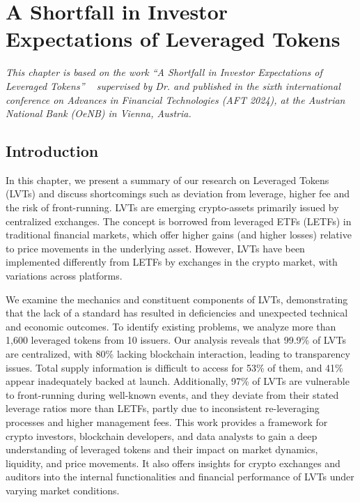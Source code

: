 
\chapter{A Shortfall in Investor Expectations of Leveraged Tokens}\label{ch:shortfall}

\textit{This chapter is based on the work ``A Shortfall in Investor Expectations of Leveraged Tokens'' ~\cite{shortfall} supervised by Dr. \supv and published in the sixth international conference on Advances in Financial Technologies (AFT 2024), at the Austrian National Bank (OeNB) in Vienna, Austria.}

\section{Introduction}
In this chapter, we present a summary of our research on Leveraged Tokens (LVTs) and discuss shortcomings such as deviation from leverage, higher fee and the risk of front-running. LVTs are emerging crypto-assets primarily issued by centralized exchanges. The concept is borrowed from leveraged ETFs (LETFs) in traditional financial markets, which offer higher gains (and higher losses) relative to price movements in the underlying asset. However, LVTs have been implemented differently from LETFs by exchanges in the crypto market, with variations across platforms.

We examine the mechanics and constituent components of LVTs, demonstrating that the lack of a standard has resulted in deficiencies and unexpected technical and economic outcomes. To identify existing problems, we analyze more than 1,600 leveraged tokens from 10 issuers. Our analysis reveals that 99.9\% of LVTs are centralized, with 80\% lacking blockchain interaction, leading to transparency issues. Total supply information is difficult to access for 53\% of them, and 41\% appear inadequately backed at launch. Additionally, 97\% of LVTs are vulnerable to front-running during well-known events, and they deviate from their stated leverage ratios more than LETFs, partly due to inconsistent re-leveraging processes and higher management fees. This work provides a framework for crypto investors, blockchain developers, and data analysts to gain a deep understanding of leveraged tokens and their impact on market dynamics, liquidity, and price movements. It also offers insights for crypto exchanges and auditors into the internal functionalities and financial performance of LVTs under varying market conditions.

